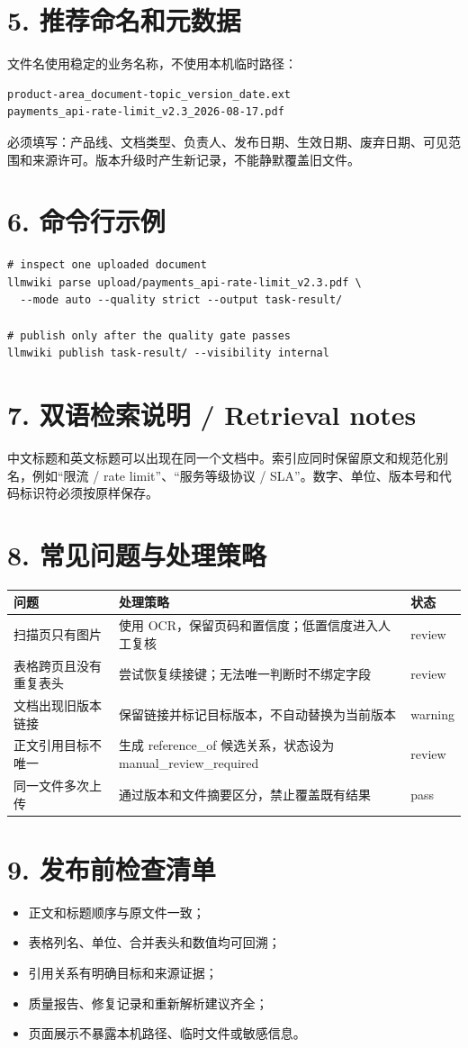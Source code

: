 \documentclass[10.5pt,a4paper]{article}
\begin{document}
\section*{5. 推荐命名和元数据}
文件名使用稳定的业务名称，不使用本机临时路径：
\begin{verbatim}
product-area_document-topic_version_date.ext
payments_api-rate-limit_v2.3_2026-08-17.pdf
\end{verbatim}
必须填写：产品线、文档类型、负责人、发布日期、生效日期、废弃日期、可见范围和来源许可。版本升级时产生新记录，不能静默覆盖旧文件。
\section*{6. 命令行示例}
\begin{verbatim}
# inspect one uploaded document
llmwiki parse upload/payments_api-rate-limit_v2.3.pdf \
  --mode auto --quality strict --output task-result/

# publish only after the quality gate passes
llmwiki publish task-result/ --visibility internal
\end{verbatim}
\section*{7. 双语检索说明 / Retrieval notes}
中文标题和英文标题可以出现在同一个文档中。索引应同时保留原文和规范化别名，例如“限流 / rate limit”、“服务等级协议 / SLA”。数字、单位、版本号和代码标识符必须按原样保存。
\newpage
\section*{8. 常见问题与处理策略}
\begin{longtable}{p{45mm}p{70mm}p{30mm}}
\toprule
问题 & 处理策略 & 状态\\\midrule
扫描页只有图片 & 使用 OCR，保留页码和置信度；低置信度进入人工复核 & review\\
表格跨页且没有重复表头 & 尝试恢复续接键；无法唯一判断时不绑定字段 & review\\
文档出现旧版本链接 & 保留链接并标记目标版本，不自动替换为当前版本 & warning\\
正文引用目标不唯一 & 生成 reference\_of 候选关系，状态设为 manual\_review\_required & review\\
同一文件多次上传 & 通过版本和文件摘要区分，禁止覆盖既有结果 & pass\\
\bottomrule
\end{longtable}
\section*{9. 发布前检查清单}
\begin{itemize}
\item 正文和标题顺序与原文件一致；
\item 表格列名、单位、合并表头和数值均可回溯；
\item 引用关系有明确目标和来源证据；
\item 质量报告、修复记录和重新解析建议齐全；
\item 页面展示不暴露本机路径、临时文件或敏感信息。
\end{itemize}
\end{document}
